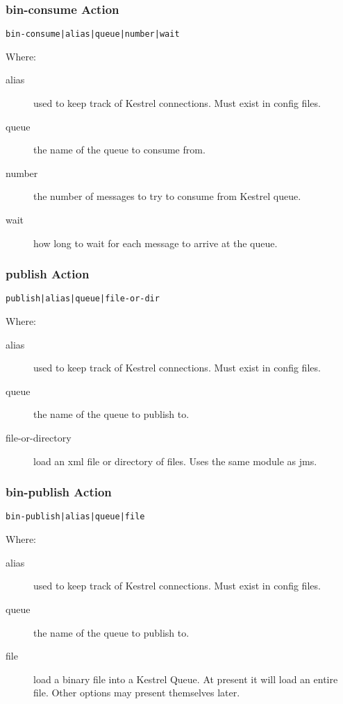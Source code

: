 \documentclass[12pt,a4paper,koma]{article}
\begin{document}
\subsubsection{bin-consume Action}
\label{sec-7-2-2}
\begin{verbatim}
bin-consume|alias|queue|number|wait
\end{verbatim}
Where:
\begin{description}
\item[{alias}] used to keep track of Kestrel connections. Must exist in
config files.
\item[{queue}] the name of the queue to consume from.
\item[{number}] the number of messages to try to consume from Kestrel
queue.
\item[{wait}] how long to wait for each message to arrive at the queue.
\end{description}
\subsubsection{publish Action}
\label{sec-7-2-3}
\begin{verbatim}
publish|alias|queue|file-or-dir
\end{verbatim}
Where:
\begin{description}
\item[{alias}] used to keep track of Kestrel connections. Must exist in
config files.
\item[{queue}] the name of the queue to publish to.
\item[{file-or-directory}] load an xml file or directory of files. Uses
the same module as jms.
\end{description}
\subsubsection{bin-publish Action}
\label{sec-7-2-4}
\begin{verbatim}
bin-publish|alias|queue|file
\end{verbatim}
Where:
\begin{description}
\item[{alias}] used to keep track of Kestrel connections. Must exist in
config files.
\item[{queue}] the name of the queue to publish to.
\item[{file}] load a binary file into a Kestrel Queue. At present it will
load an entire file. Other options may present themselves later.
\end{description}
\end{document}
